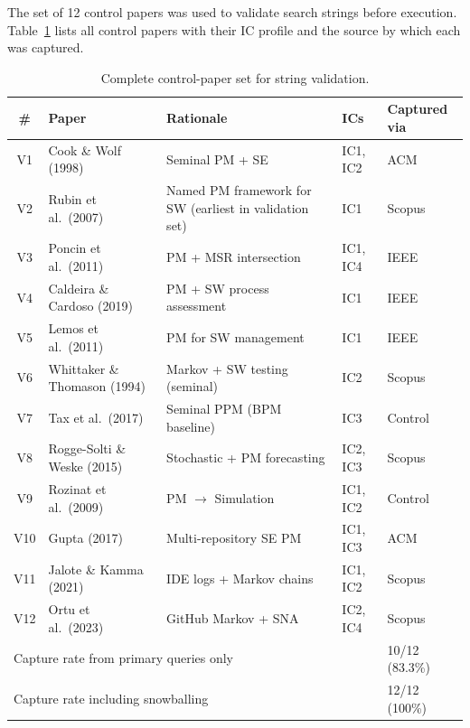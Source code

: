 The set of 12 control papers was used to validate search strings before
execution. Table~\ref{tab:app-control} lists all control papers with their
IC profile and the source by which each was captured.

\begin{table}[htbp]
\centering
\caption{Complete control-paper set for string validation.}
\label{tab:app-control}
\small
\setlength{\tabcolsep}{4pt}
\begin{tabular}{c p{4.2cm} p{3.6cm} l l}
\toprule
\textbf{\#} & \textbf{Paper} & \textbf{Rationale} & \textbf{ICs} &
  \textbf{Captured via} \\
\midrule
V1  & Cook \& Wolf (1998)~\cite{cook1998}              & Seminal PM + SE             & IC1, IC2 & ACM \\
V2  & Rubin et al.\ (2007)~\cite{rubin2007}            & Named PM framework for SW (earliest in validation set)   & IC1  & Scopus \\
V3  & Poncin et al.\ (2011)~\cite{poncin2011process}          & PM + MSR intersection         & IC1, IC4 & IEEE \\
V4  & Caldeira \& Cardoso (2019)                        & PM + SW process assessment & IC1    & IEEE \\
V5  & Lemos et al.\ (2011)                              & PM for SW management        & IC1      & IEEE \\
V6  & Whittaker \& Thomason (1994)~\cite{whittaker1994} & Markov + SW testing (seminal) & IC2     & Scopus \\
V7  & Tax et al.\ (2017)~\cite{tax2017}                & Seminal PPM (BPM baseline)  & IC3      & Control \\
V8  & Rogge-Solti \& Weske (2015)                       & Stochastic + PM forecasting & IC2, IC3 & Scopus \\
V9  & Rozinat et al.\ (2009)                            & PM $\rightarrow$ Simulation  & IC1, IC2 & Control \\
V10 & Gupta (2017)~\cite{gupta2017}                    & Multi-repository SE PM     & IC1, IC3 & ACM \\
V11 & Jalote \& Kamma (2021)~\cite{jalote2021}         & IDE logs + Markov chains & IC1, IC2 & Scopus \\
V12 & Ortu et al.\ (2023)~\cite{ortu2023}              & GitHub Markov + SNA         & IC2, IC4 & Scopus \\
\midrule
\multicolumn{4}{l}{Capture rate from primary queries only} & 10/12 (83.3\%) \\
\multicolumn{4}{l}{Capture rate including snowballing}            & 12/12 (100\%) \\
\bottomrule
\end{tabular}
\end{table}

